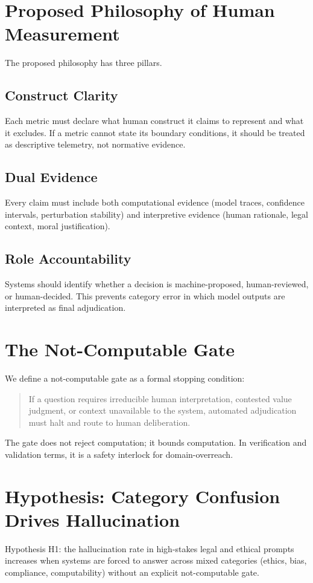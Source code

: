 \documentclass[conference]{IEEEtran}
\begin{document}
\section{Proposed Philosophy of Human Measurement}
The proposed philosophy has three pillars.

\subsection{Construct Clarity}
Each metric must declare what human construct it claims to represent and what it excludes. If a metric cannot state its boundary conditions, it should be treated as descriptive telemetry, not normative evidence.

\subsection{Dual Evidence}
Every claim must include both computational evidence (model traces, confidence intervals, perturbation stability) and interpretive evidence (human rationale, legal context, moral justification).

\subsection{Role Accountability}
Systems should identify whether a decision is machine-proposed, human-reviewed, or human-decided. This prevents category error in which model outputs are interpreted as final adjudication.

\section{The Not-Computable Gate}
We define a not-computable gate as a formal stopping condition:
\begin{quote}
If a question requires irreducible human interpretation, contested value judgment, or context unavailable to the system, automated adjudication must halt and route to human deliberation.
\end{quote}

The gate does not reject computation; it bounds computation. In verification and validation terms, it is a safety interlock for domain-overreach.

\section{Hypothesis: Category Confusion Drives Hallucination}
Hypothesis H1: the hallucination rate in high-stakes legal and ethical prompts increases when systems are forced to answer across mixed categories (ethics, bias, compliance, computability) without an explicit not-computable gate.
\end{document}
